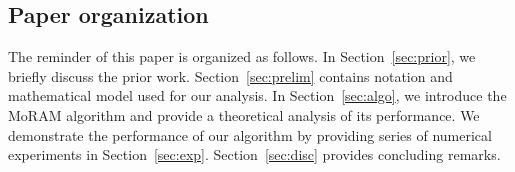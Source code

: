 \subsection{Paper organization} 
The reminder of this paper is organized as follows. In Section~\ref{sec:prior}, we briefly discuss the prior work. Section~\ref{sec:prelim} contains notation and mathematical model used for our analysis. In Section~\ref{sec:algo}, we introduce the MoRAM algorithm and provide a theoretical analysis of its performance. We demonstrate the performance of our algorithm by providing series of numerical experiments in Section~\ref{sec:exp}. Section~\ref{sec:disc} provides concluding remarks.